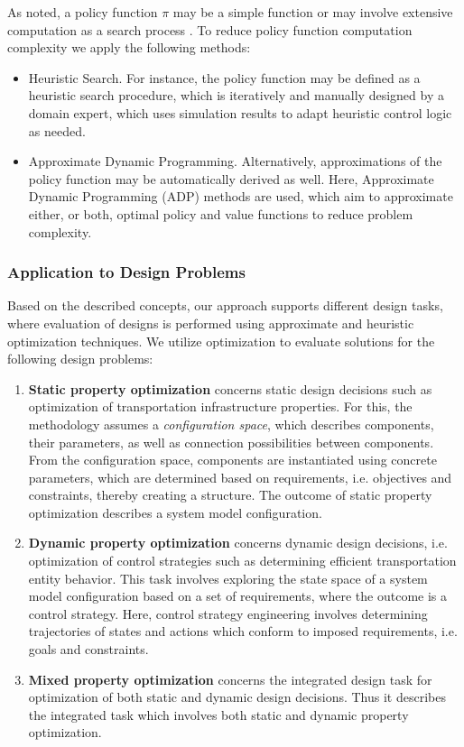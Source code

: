 \documentclass[a4paper,twoside]{article}
\begin{document}
As noted, a policy function $\pi$ may be a simple function or may involve extensive computation as a search process \cite{mania2018simple}. To reduce policy function computation complexity we apply the following methods:
\begin{itemize}
	\item Heuristic Search. For instance, the policy function may be defined as a heuristic search procedure, which is iteratively and manually designed by a domain expert, which uses simulation results to adapt heuristic control logic as needed. 
	\item Approximate Dynamic Programming. Alternatively, approximations of the policy function may be automatically derived as well. Here, Approximate Dynamic Programming (ADP) methods \cite{powell_approximate_2007} are used, which aim to approximate either, or both, optimal policy and value functions to reduce problem complexity. 
\end{itemize}

	\subsubsection{Application to Design Problems}
	Based on the described concepts, our approach supports different design tasks, where evaluation of designs is performed using approximate and heuristic optimization techniques. We utilize optimization to evaluate solutions for the following design problems:

	\begin{enumerate}
		\item \textbf{Static property optimization} concerns static design decisions such as optimization of transportation infrastructure properties. For this, the methodology assumes a \textit{configuration space}, which describes components, their parameters, as well as connection possibilities between components. From the configuration space, components are instantiated using concrete parameters, which are determined based on requirements, i.e. objectives and constraints, thereby creating a structure. The outcome of static property  optimization describes a system model configuration.
		\item \textbf{Dynamic property optimization} concerns dynamic design decisions, i.e. optimization of control strategies such as determining efficient transportation entity behavior. This task involves exploring the state space of a system model configuration based on a set of requirements, where the outcome is a control strategy. Here, control strategy engineering involves determining trajectories of states and actions which conform to imposed requirements, i.e. goals and constraints. 
		\item \textbf{Mixed property optimization} concerns the integrated design task for optimization of both static and dynamic design decisions. Thus it describes the integrated task which involves both static and dynamic property optimization.
	\end{enumerate}
	
\end{document}
